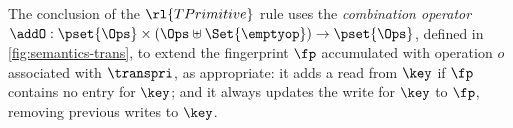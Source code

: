 



The conclusion of the \( \rl{TPrimitive}\)  rule uses the \emph{combination operator} 
\(\addO: \pset{\Ops} \times (\Ops \uplus \Set{\emptyop}) \to \pset{\Ops}\), defined 
in \cref{fig:semantics-trans}, to extend the fingerprint \(\fp\) accumulated with
operation \(o\) associated with \(\transpri\), as
appropriate: it adds  a read from \(\key\)  if \(\fp\) 
contains no entry for \(\key\); and it always updates the  write for 
\(\key\) to \(\fp\), removing previous writes to \(\key\).

